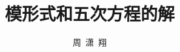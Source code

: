 \documentclass[bachelor,twoside,openright]{ustcthesis}
\title{模形式和五次方程的解}%
\author{周\ 潇\ 翔}
\numberwithin{equation}{section}
\theoremstyle{definition}
\theoremstyle{plain}
\begin{document}
\maketitle


\frontmatter
\makeatletter



\tableofcontents



\makeatother

\mainmatter

  
  

\backmatter

\renewcommand\refname{{\textbf{参考文献}}}
	

\end{document}
